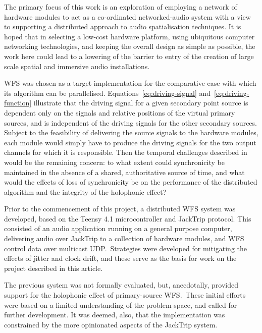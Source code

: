 The primary focus of this work is an exploration of employing a network of
hardware modules to act as a co-ordinated networked-audio system with a view to
supporting a distributed approach to audio spatialisation techniques.
It is hoped that in selecting a low-cost hardware platform, using ubiquitous
computer networking technologies, and keeping the overall design as simple as
possible, the work here could lead to a lowering of the barrier to entry of
the creation of large scale spatial and immersive audio installations.

WFS was chosen as a target implementation for the comparative ease with which
its algorithm can be parallelised.
Equations~\eqref{eq:driving-signal} and~\eqref{eq:driving-function} illustrate
that the driving signal for a given secondary point source is dependent only
on the signals and relative positions of the virtual primary sources, and is
independent of the driving signals for the other secondary sources.
Subject to the feasibility of delivering the source signals to the hardware
modules, each module would simply have to produce the driving signals for the
two output channels for which it is responsible.
Then the temporal challenges described in  would
be the remaining concern: to what extent could synchronicity be maintained
in the absence of a shared, authoritative source of time, and what would the
effects of loss of synchronicity be on the performance of the distributed
algorithm and the integrity of the holophonic effect?

Prior to the commencement of this project, a distributed WFS system was
developed, based on the Teensy 4.1 microcontroller and JackTrip protocol.
This consisted of an audio application running on a general purpose computer,
delivering audio over JackTrip to a collection of hardware modules, and
WFS control data over multicast UDP.\
Strategies were developed for mitigating the effects of jitter and clock drift,
and these serve as the basis for work on the project described in this article.

The previous system was not formally evaluated, but, anecdotally, provided
support for the holophonic effect of primary-source WFS.\
These initial efforts were based on a limited understanding of the
problem-space, and called for further development.
It was deemed, also, that the implementation was constrained by the more
opinionated aspects of the JackTrip system.
